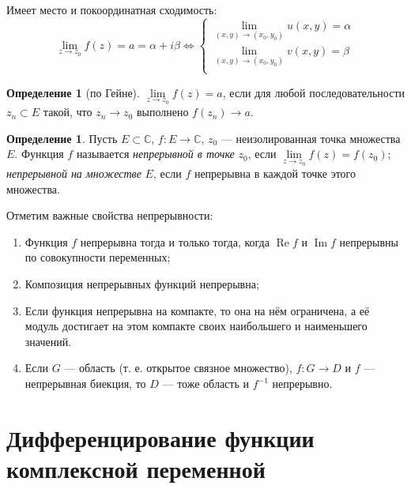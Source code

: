 \documentclass[11pt,openany,a4paper]{scrartcl}
\theoremstyle{plain}
\theoremstyle{definition}
\newtheorem{definition}[theorem]{Определение}
\newcommand\mb{\mathbb}
\newcommand{\complex}{\mb C}
\DeclareMathOperator{\Ree}{Re}
\DeclareMathOperator{\Img}{Im}
\begin{document}
Имеет место и покоординатная сходимость: $$
\lim_{z \rightarrow z_0} f(z) = a = \alpha + i\beta \iff 
\begin{cases}
	\lim\limits_{(x, y) \rightarrow (x_0, y_0)} u(x, y) = \alpha\\
	\lim\limits_{(x, y) \rightarrow (x_0, y_0)} v(x, y) = \beta\\
\end{cases}
$$

\begin{definition}[по Гейне]
	$\lim\limits_{z \rightarrow z_0} f(z) = a$, если для любой последовательности $z_n \subset E$ такой, что $z_n 
	\rightarrow z_0$ выполнено $f(z_n) \rightarrow a$.
\end{definition}
\begin{definition}
	Пусть $E \subset \complex$, $f: E \rightarrow \complex$, $z_0$ — неизолированная точка множества $E$. Функция $f$ 
	называется \emph{непрерывной в точке} $z_0$, если $\lim\limits_{z \rightarrow z_0} f(z) = f(z_0)$; \emph{непрерывной на 
	множестве} $E$, если $f$ непрерывна в каждой точке этого множества.
\end{definition}

Отметим важные свойства непрерывности:
\begin{enumerate}
	\item Функция $f$ непрерывна тогда и только тогда, когда $\Ree f$ и $\Img f$ непрерывны по совокупности переменных;
	\item Композиция непрерывных функций непрерывна;
	\item Если функция непрерывна на компакте, то она на нём ограничена, а её модуль достигает на этом компакте своих 
	наибольшего и наименьшего значений.
	\item Если $G$ — область (т. е. открытое связное множество), $f: G \rightarrow D$ и $f$ — непрерывная биекция, то
	$D$ — тоже область и $f^{-1}$ непрерывно.
\end{enumerate}

\section{Дифференцирование функции комплексной переменной}
\end{document}
